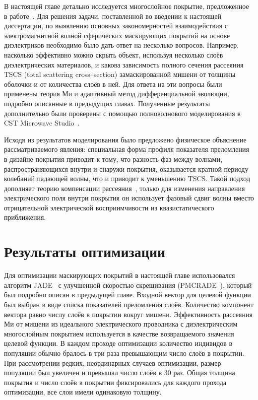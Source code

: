 В настоящей главе детально исследуется многослойное покрытие,
предложенное в работе~\cite{Semouchkina-2013}. Для решения задачи,
поставленной во введении к настоящей диссертации, по выявлению
основных закономерностей взаимодействия с электромагнитной волной
сферических маскирующих покрытий на основе диэлектриков необходимо
было дать ответ на несколько вопросов. Например, насколько эффективно
можно скрыть объект, используя несколько слоёв диэлектрических
материалов, и какова зависимость полного сечения рассеяния TSCS (total
scattering cross--section) замаскированной мишени от толщины оболочки и
от количества слоёв в ней. Для ответа на эти вопросы были применены теория Ми и
адаптивный метод дифференциальной эволюции, подробно описанные в
предыдущих главах. Полученные результаты дополнительно были проверены с
помощью полноволнового моделирования в CST Microwave
Studio~\cite{CST-web}.
 
Исходя из результатов моделирования было предложено физическое
объяснение рассматриваемого явления: специальная форма профиля
показателя преломления в дизайне покрытия приводит к тому, что
разность фаз между волнами, распространяющихся внутри и снаружи
покрытия, оказывается кратной периоду колебаний падающей волны, что и
приводит к уменьшению TSCS. Такой подход дополняет теорию компенсации
рассеяния~\cite{alu}, только для изменения направления электрического
поля внутри покрытия он использует фазовый сдвиг волны вместо
отрицательной электрической восприимчивости из квазистатического
приближения.

\section{Результаты оптимизации}  
Для оптимизации маскирующих покрытий в настоящей главе использовался
алгоритм JADE~\cite{Jingqiao-JADE-2009} с улучшенной скоростью
скрещивания (PMCRADE~\cite{Li-PMCRADE-2011}), который был подробно
описан в предыдущей главе.  Входной вектор для целевой функции был
выбран в виде списка показателей преломления слоёв. Количество
компонент вектора равно числу слоёв в покрытии вокруг
мишени. Эффективность рассеяния Ми от мишени из идеального
электрического проводника с диэлектрическим многослойным покрытием
используется в качестве возвращаемого значения целевой функции. В
каждом проходе оптимизации количество индивидов в популяции обычно
бралось в три раза превышающим число слоёв в покрытии. При
рассмотрении редких, неординарных случаев оптимизации, размер
популяции был увеличен и превышал число слоёв в 30 раз. Общая толщина
покрытия и число слоёв в покрытии фиксировались для каждого прохода
оптимизации, все слои имели одинаковую толщину.
 


